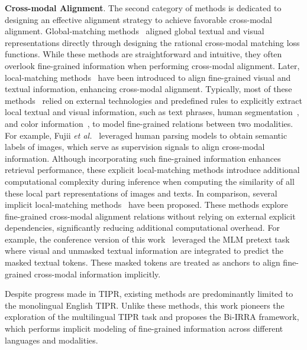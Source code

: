 \documentclass[10pt,journal,compsoc]{IEEEtran}
\begin{document}
\textbf{Cross-modal Alignment}.
The second category of methods is dedicated to designing an effective alignment strategy to achieve favorable cross-modal alignment.
Global-matching methods~\cite{zhang2018deep, zheng2020dual, chen2018improving, wang2019language, cao2024empirical} aligned global textual and visual representations directly through designing the rational cross-modal matching loss functions. While these methods are straightforward and intuitive, they often overlook fine-grained information when performing cross-modal alignment.
Later, local-matching methods~\cite{niu2020improving, wang2022caibc, wang2022look, wu2024text, wang2020vitaa, wu2021lapscore, jing2020pose} have been introduced to align fine-grained visual and textual information, enhancing cross-modal alignment.
Typically, most of these methods~\cite{wang2020vitaa, wu2021lapscore, jing2020pose, chen2022tipcb, fujii2023bilma} relied on external technologies and predefined rules to explicitly extract local textual and visual information, such as text phrases, human segmentation~\cite{wang2020vitaa, fujii2023bilma}, and color information~\cite{wu2021lapscore}, to model fine-grained relations between two modalities. For example, Fujii \textit{et al.}~\cite{fujii2023bilma} leveraged human parsing models to obtain semantic labels of images, which serve as supervision signals to align cross-modal information.
Although incorporating such fine-grained information enhances retrieval performance, these explicit local-matching methods introduce additional computational complexity during inference when computing the similarity of all these local part representations of images and texts.
In comparison, several implicit local-matching methods~\cite{jiang2023cross, bai2023rasa, yan2023image, yang2023towards, li2024adaptive, zuo2024ufinebench} have been proposed. These methods explore fine-grained cross-modal alignment relations without relying on external explicit dependencies, significantly reducing additional computational overhead. For example, the conference version of this work~\cite{jiang2023cross} leveraged the MLM pretext task where visual and unmasked textual information are integrated to predict the masked textual tokens. These masked tokens are treated as anchors to align fine-grained cross-modal information implicitly. 

Despite progress made in TIPR, existing methods are predominantly limited to the monolingual English TIPR.
Unlike these methods, this work pioneers the exploration of the multilingual TIPR task and proposes the Bi-IRRA framework, which performs implicit modeling of fine-grained information across different languages and modalities.
\end{document}
